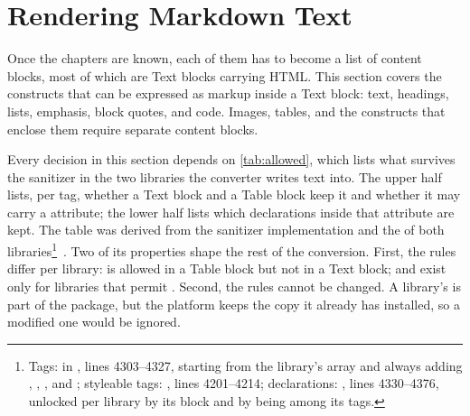 \section{Rendering Markdown Text}
\label{sec:markup}

Once the chapters are known, each of them has to become a list of content blocks, most of which are
Text blocks carrying HTML.
This section covers the constructs that can be expressed as markup inside a Text block: text,
headings, lists, emphasis, block quotes, and code.
Images, tables, and the constructs that enclose them require separate content blocks.

Every decision in this section depends on \autoref{tab:allowed}, which lists what survives the
sanitizer in the two libraries the converter writes text into.
The upper half lists, per tag, whether a Text block and a Table block keep it and whether it may
carry a  attribute; the lower half lists which declarations inside that attribute
are kept.
The table was derived from the sanitizer implementation and the  of both
libraries\footnote{\raggedright Tags:  in
, lines 4303--4327, starting from the library's  array and
always adding , , , and ; styleable tags:
, lines 4201--4214; declarations: , lines
4330--4376, unlocked per library by its  block and by  being among its
tags.}~\cite{H5P:PhpLibrary}.
Two of its properties shape the rest of the conversion.
First, the rules differ per library:  is allowed in a Table block but not in a Text
block;  and  exist only for libraries that permit .
Second, the rules cannot be changed.
A library's  is part of the package, but the platform keeps the copy it already
has installed, so a modified one would be ignored.

